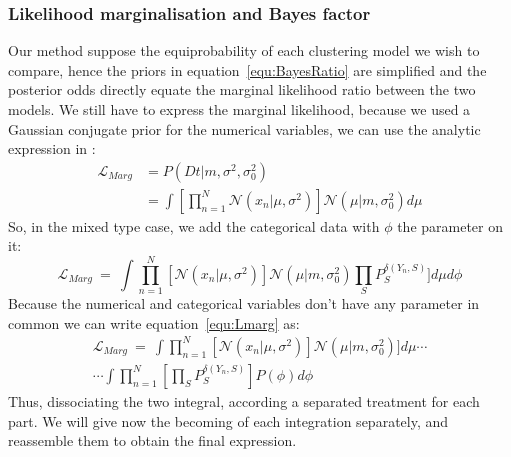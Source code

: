 \documentclass[twocolumn,12pt]{article}
\begin{document}
\subsubsection{Likelihood marginalisation and Bayes factor}

Our method suppose the equiprobability of each clustering model we wish to compare, hence the priors in equation~\ref{equ:BayesRatio} are simplified and the posterior odds directly equate the marginal likelihood ratio between the two models.
We still have to express the marginal likelihood, because we used a Gaussian conjugate prior for the numerical variables, we can use the analytic expression in \cite{murphy}:
\begin{align}
    \mathcal{L}_{Marg} &= P(Dt|m,\sigma^2,\sigma_0^2) \nonumber \\ 
                     &= \int[\prod_{n=1}^N\mathcal{N}(x_n|\mu,\sigma^2)]\mathcal{N}(\mu|m,\sigma_0^2)d\mu
    \label{equ:postuMarph}
\end{align}
So, in the mixed type case, we add the categorical data with $\phi$ the parameter on it:
\begin{equation}
    \mathcal{L}_{Marg}\ =\ \int\prod_{n=1}^N[\mathcal{N}(x_n|\mu,\sigma^2)]\mathcal{N}(\mu|m,\sigma_0^2)\prod_SP_{S}^{\delta(Y_{n},S)}]d\mu d\phi
    \label{equ:Lmarg}
\end{equation}
Because the numerical and categorical variables don't have any parameter in common we can write equation~\ref{equ:Lmarg} as:
\begin{align}
    \mathcal{L}_{Marg}\ =\ \int\prod_{n=1}^N[\mathcal{N}(x_n|\mu,\sigma^2)]\mathcal{N}(\mu|m,\sigma_0^2)]d\mu\cdots \nonumber \\
                    \cdots\int\prod_{n=1}^N[\prod_SP_{S}^{\delta(Y_{n},S)}]P(\phi)d\phi
    \label{equ:Lmarg}
\end{align}
Thus, dissociating the two integral, according a separated treatment for each part.
We will give now the becoming of each integration separately, and reassemble them to obtain the final expression.\\
\end{document}
